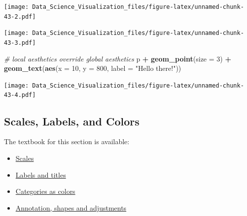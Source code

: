 \documentclass[
]{article}
\newenvironment{Shaded}{\begin{snugshade}}{\end{snugshade}}
\newcommand{\CommentTok}[1]{\textcolor[rgb]{0.56,0.35,0.01}{\textit{#1}}}
\newcommand{\DataTypeTok}[1]{\textcolor[rgb]{0.13,0.29,0.53}{#1}}
\newcommand{\DecValTok}[1]{\textcolor[rgb]{0.00,0.00,0.81}{#1}}
\newcommand{\FloatTok}[1]{\textcolor[rgb]{0.00,0.00,0.81}{#1}}
\newcommand{\KeywordTok}[1]{\textcolor[rgb]{0.13,0.29,0.53}{\textbf{#1}}}
\newcommand{\NormalTok}[1]{#1}
\newcommand{\OperatorTok}[1]{\textcolor[rgb]{0.81,0.36,0.00}{\textbf{#1}}}
\newcommand{\StringTok}[1]{\textcolor[rgb]{0.31,0.60,0.02}{#1}}
\providecommand{\tightlist}{%
  \setlength{\itemsep}{0pt}\setlength{\parskip}{0pt}}
\begin{document}
\texttt{[image: Data\_Science\_Visualization\_files/figure-latex/unnamed-chunk-43-2.pdf]}

\begin{Shaded}
\end{Shaded}

\texttt{[image: Data\_Science\_Visualization\_files/figure-latex/unnamed-chunk-43-3.pdf]}

\begin{Shaded}
\begin{Highlighting}[]
\CommentTok{# local aesthetics override global aesthetics}
\NormalTok{p }\OperatorTok{+}\StringTok{ }\KeywordTok{geom_point}\NormalTok{(}\DataTypeTok{size =} \DecValTok{3}\NormalTok{) }\OperatorTok{+}
\StringTok{    }\KeywordTok{geom_text}\NormalTok{(}\KeywordTok{aes}\NormalTok{(}\DataTypeTok{x =} \DecValTok{10}\NormalTok{, }\DataTypeTok{y =} \DecValTok{800}\NormalTok{, }\DataTypeTok{label =} \StringTok{"Hello there!"}\NormalTok{))}
\end{Highlighting}
\end{Shaded}

\texttt{[image: Data\_Science\_Visualization\_files/figure-latex/unnamed-chunk-43-4.pdf]}

\hypertarget{scales-labels-and-colors}{%
\subsection{Scales, Labels, and Colors}\label{scales-labels-and-colors}}

The textbook for this section is available:

\begin{itemize}
\tightlist
\item
  \href{https://rafalab.github.io/dsbook/ggplot2.html\#scales}{Scales}
\item
  \href{https://rafalab.github.io/dsbook/ggplot2.html\#labels-and-titles}{Labels
  and titles}
\item
  \href{https://rafalab.github.io/dsbook/ggplot2.html\#categories-as-colors}{Categories
  as colors}
\item
  \href{https://rafalab.github.io/dsbook/ggplot2.html\#annotation-shapes-and-adjustments}{Annotation,
  shapes and adjustments}
\end{itemize}
\end{document}

